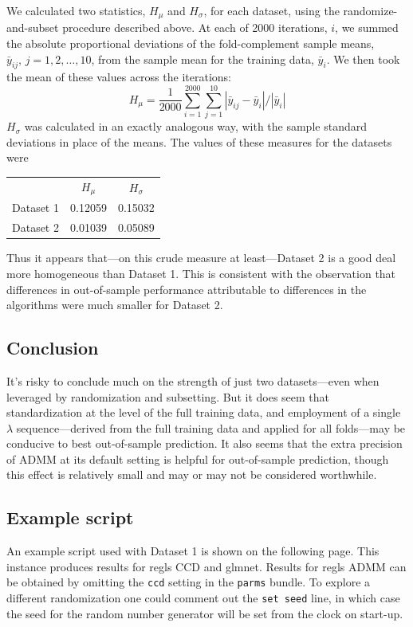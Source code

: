 \documentclass{article}
\begin{document}
We calculated two statistics, $H_\mu$ and $H_\sigma$, for each
dataset, using the randomize-and-subset procedure described above.  At
each of 2000 iterations, $i$, we summed the absolute proportional
deviations of the fold-complement sample means,
$\bar{y}_{ij},\, j=1,2,\dots,10$, from the sample mean for the
training data, $\bar{y}_i$. We then took the mean of these values
across the iterations:
\[
  H_\mu = \frac{1}{2000} \sum_{i=1}^{2000} \sum_{j=1}^{10} |\bar{y}_{ij} - \bar{y}_i|/|\bar{y}_i|
\]
$H_\sigma$ was calculated in an exactly analogous way, with the sample
standard deviations in place of the means.  The values of these
measures for the datasets were
\begin{center}
  \begin{tabular}{lcc}
    & $H_\mu$ & $H_\sigma$ \\
    Dataset 1 & 0.12059 & 0.15032 \\
    Dataset 2 & 0.01039 & 0.05089
  \end{tabular}
\end{center}
Thus it appears that---on this crude measure at least---Dataset 2 is a
good deal more homogeneous than Dataset 1. This is consistent with the
observation that differences in out-of-sample performance attributable
to differences in the algorithms were much smaller for Dataset 2.

\subsection*{Conclusion}

It's risky to conclude much on the strength of just two
datasets---even when leveraged by randomization and subsetting. But it
does seem that standardization at the level of the full training data,
and employment of a single $\lambda$ sequence---derived from the full
training data and applied for all folds---may be conducive to best
out-of-sample prediction. It also seems that the extra precision of
ADMM at its default setting is helpful for out-of-sample prediction,
though this effect is relatively small and may or may not be
considered worthwhile.

\subsection*{Example script}

An example script used with Dataset 1 is shown on the following page.
This instance produces results for \textsf{regls} CCD and
\textsf{glmnet}. Results for \textsf{regls} ADMM can be obtained by
omitting the \texttt{ccd} setting in the \texttt{parms} bundle.  To
explore a different randomization one could comment out the
\texttt{set seed} line, in which case the seed for the random number
generator will be set from the clock on start-up.
\end{document}

